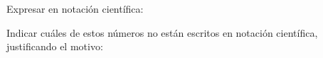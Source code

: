 \documentclass[12pt]{exam}
\begin{document}
\begin{questions}
\begin{parts}
    \end{parts}

    \question Expresar en notación científica:
    \begin{parts}
    \end{parts}

    \question Indicar cuáles de estos números no están escritos en notación científica, justificando el motivo:
    \begin{parts}
        \begin{multicols}{2}         
        

\end{multicols}
\end{parts}
\end{questions}
\end{document}
